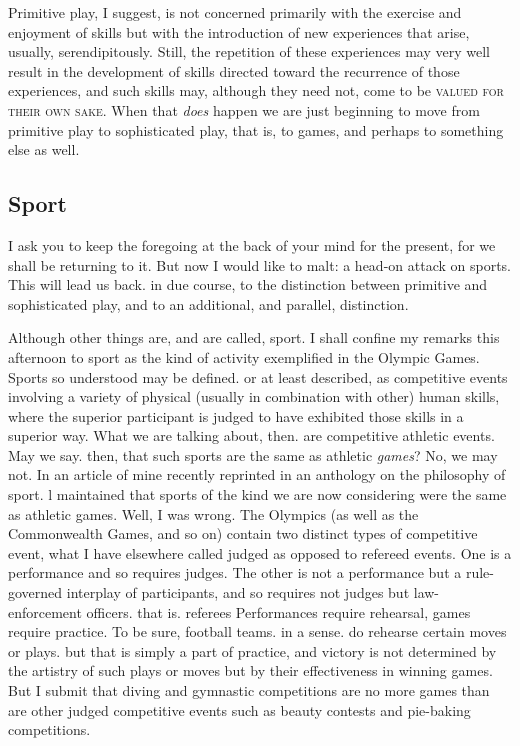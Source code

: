 \documentclass{tufte-handout}
\begin{document}
Primitive play, I suggest, is not concerned primarily with the exercise and enjoyment of skills but with the introduction of new experiences that arise, usually, serendipitously. Still, the repetition of these experiences may very well result in the development of skills directed toward the recurrence of those experiences, and such skills may, although they need not, come to be \textsc{valued for their own sake}. When that \textit{does} happen we are just beginning to move from primitive play to sophisticated play, that is, to games, and perhaps to something else as well. 

\subsection{Sport}

I ask you to keep the foregoing at the back of your mind for the present, for we shall be returning to it. But now I would like to malt: a head-on attack on sports. This will lead us back. in due course, to the distinction between primitive and sophisticated play, and to an additional, and parallel, distinction. 

Although other things are, and are called, sport. I shall confine my remarks this afternoon to sport as the kind of activity exemplified in the Olympic Games. Sports so understood may be defined. or at least described, as competitive events involving a variety of physical (usually in combination with other) human skills, where the superior participant is judged to have exhibited those skills in a superior way. What we are talking about, then. are competitive athletic events. May we say. then, that such sports are the same as athletic \textit{games}? No, we may not. In an article of mine recently reprinted in an anthology on the philosophy of sport. l maintained that sports of the kind we are now considering were the same as athletic games. Well, I was wrong. The Olympics (as well as the Commonwealth Games, and so on) contain two distinct types of competitive event, what I have elsewhere called judged as opposed to refereed events. One is a performance and so requires judges. The other is not a performance but a rule-governed interplay of participants, and so requires not judges but law-enforcement officers. that is. referees Performances require rehearsal, games require practice. To be sure, football teams. in a sense. do rehearse certain moves or plays. but that is simply a part of practice, and victory is not determined by the artistry of such plays or moves but by their effectiveness in winning games. But I submit that diving and gymnastic competitions are no more games than are other judged competitive events such as beauty contests and pie-baking competitions. 
\end{document}
